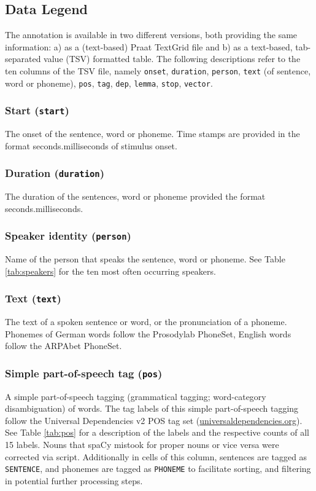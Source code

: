 \documentclass[10pt,a4paper,onecolumn]{article}
\begin{document}
\subsection*{Data Legend}
The annotation is available in two different versions, both providing the same
information: a) as a (text-based) Praat TextGrid file and b) as a text-based,
tab-separated value (TSV) formatted table.
The following descriptions refer to the ten columns of the TSV file, namely
\texttt{onset}, \texttt{duration}, \texttt{person}, \texttt{text} (of sentence,
word or phoneme), \texttt{pos}, \texttt{tag}, \texttt{dep}, \texttt{lemma},
\texttt{stop}, \texttt{vector}.


\subsubsection*{Start (\texttt{start})} The onset of the sentence, word or
phoneme. Time stamps are provided in the format seconds.milliseconds of stimulus
onset.


\subsubsection*{Duration (\texttt{duration})} The duration of the sentences,
word or phoneme provided the format seconds.milliseconds.


\subsubsection*{Speaker identity (\texttt{person})} Name of the person that
speaks the sentence, word or phoneme. See Table \ref{tab:speakers} for the ten
most often occurring speakers.


\subsubsection*{Text (\texttt{text})}
The text of a spoken sentence or word, or the pronunciation of a phoneme.
Phonemes of German words follow the Prosodylab PhoneSet, English words follow
the ARPAbet PhoneSet.


\subsubsection*{Simple part-of-speech tag (\texttt{pos})} A simple
part-of-speech tagging (grammatical tagging; word-category disambiguation) of
words.
The tag labels of this simple part-of-speech tagging follow the Universal
Dependencies v2 POS tag set
(\href{https://universaldependencies.org}{universaldependencies.org}).
See Table \ref{tab:pos} for a description of the labels and the respective
counts of all 15 labels. Nouns that spaCy mistook for proper nouns or vice versa
were corrected via script.
Additionally in cells of this column, sentences are tagged as \texttt{SENTENCE},
and phonemes are tagged as \texttt{PHONEME} to facilitate sorting, and filtering
in potential further processing steps.
\end{document}
